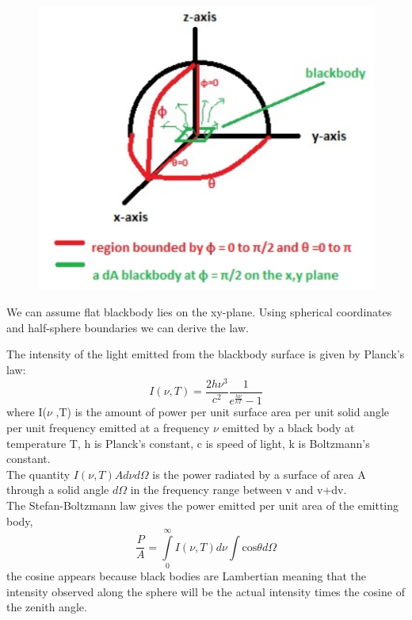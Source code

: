 \documentclass[11pt,a4paper]{article}
\begin{document}
{\begin{figure}[H]
\begin{center}
				\includegraphics[scale=0.6]{pl.png}
			\end{center}
		\end{figure}
	    We can assume flat blackbody lies on the xy-plane. Using spherical coordinates and half-sphere boundaries we can derive the law.
	    \par The intensity of the light emitted from the blackbody surface is given by Planck's law:
	    \begin{equation}
	    I\left(\nu ,T\right)=\frac{2h{\nu }^{3}}{{c}^{2}}\frac{1}{{e}^{\frac{h\nu}{kT}}-1}
	    \end{equation}
	    where I($\nu$ ,T) is the amount of power per unit surface area per unit solid angle per unit frequency emitted at a frequency $\nu$ emitted by a black body at temperature T, h is Planck's constant, c is speed of light, k is Boltzmann's constant.\\
	    The quantity $I(\nu,T)Ad\nu d\Omega$ is the power radiated by a surface of area A through a solid angle $d\Omega$ in the frequency range between v and v+dv.\\
	    The Stefan-Boltzmann law gives the power emitted per unit area of the emitting body,
	    \begin{equation}
	    \frac{P}{A}=\underset{0}{\overset{\infty }{\int }}I\left(\nu ,T\right)d\nu \int \mathrm{cos}\theta d\Omega
	    \end{equation}
	    the cosine appears because black bodies are Lambertian meaning that the intensity observed along the sphere will be the actual intensity times the cosine of the zenith angle.
	    \begin{equation}

\end{equation}}
\end{document}
